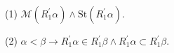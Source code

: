 (1) $\mathcal{M}(R_1^\prime\alpha) \wedge \text{St}(R_1^\prime\alpha)$.

(2) $\alpha < \beta \rightarrow R_1^\prime\alpha \in R_1^\prime\beta \wedge R_1^\prime\alpha \subset R_1^\prime\beta$.
